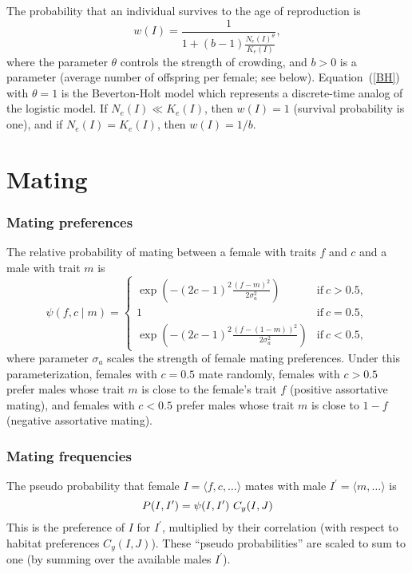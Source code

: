 \documentclass{article}
\begin{document}
The probability that an individual survives to the age of reproduction is
\begin{equation} \label{BH}
  w(I)=\frac{1}{1+(b-1)\frac{N_e(I)^\theta}{K_e(I)}},
\end{equation}
where the parameter $\theta$ controls the strength of crowding, and $b>0$ is a parameter
(average number of offspring per female; see below).
Equation~(\ref{BH}) with $\theta = 1$ is the Beverton-Holt model which represents a discrete-time analog of the logistic model.
If $N_e(I) \ll K_e(I)$, then $w(I)=1$ (survival probability is one),
and if $N_e(I)=K_e(I)$, then $w(I)=1/b$.


\section{Mating}

\subsubsection{Mating preferences}

The relative probability of mating between a
female with traits $f$ and $c$ and a male with trait $m$ is
\begin{equation} \label{pref}
  \psi(f,c\mid m) = \left\{
    \begin{array}{ll}
      \exp \left( -(2c-1)^2 \frac{(f-m)^2}{2\sigma_a^2}\right)
        & \mbox{if}\ c > 0.5,\\
      1 & \mbox{if}\ c=0.5,\\
      \exp \left( -(2c-1)^2 \frac{(f-(1-m))^2}{2\sigma_a^2}\right)
        & \mbox{if}\ c<0.5,
    \end{array} \right.
\end{equation}
where parameter $\sigma_a$ scales the strength of female mating preferences.
Under this parameterization, females with $c=0.5$ mate randomly, females with $c>0.5$ prefer males whose trait $m$ is close to the female's trait $f$ (positive assortative mating), and females with $c<0.5$ prefer males whose trait $m$ is close to $1-f$ (negative assortative mating). 


\subsubsection{Mating frequencies}

The pseudo probability that female
$I = \langle f,c,\ldots \rangle$ mates with male $I^{\prime}= \langle m,\ldots \rangle$ is
\begin{equation}
  P(I,I^{\prime}) = \psi(I,I^{\prime})\ C_y(I,J) \\
\end{equation}
This is the preference of $I$ for $I^{\prime}$, multiplied by their correlation (with respect to habitat preferences $C_y(I,J)$).
These ``pseudo probabilities'' are scaled to sum to one (by summing over the available males $I^\prime$).
\end{document}
